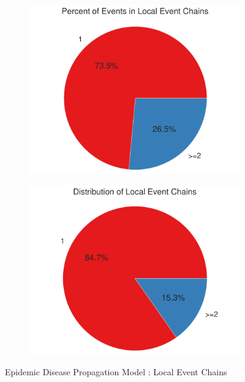 \documentclass[11pt]{book}
\begin{document}
\begin{figure}
    \centering
    \begin{subfigure}{.48\textwidth}
        \centering
        \includegraphics[width=1\textwidth]{figures/local_event_chain/epidemic_total.pdf}
    \end{subfigure}
    \begin{subfigure}{.48\textwidth}
        \centering
        \includegraphics[width=1\textwidth]{figures/local_event_chain/epidemic_summary.pdf}
    \end{subfigure}
    \caption{Epidemic Disease Propagation Model : Local Event Chains}
    \label{fig:local_event_chain:epidemic}
\end{figure}
\end{document}
